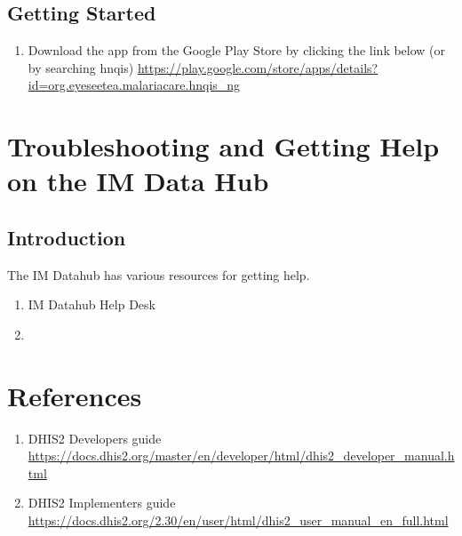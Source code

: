 \documentclass[]{book}
\providecommand{\tightlist}{%
  \setlength{\itemsep}{0pt}\setlength{\parskip}{0pt}}
\begin{document}
\hypertarget{getting-started-1}{%
\section{Getting Started}\label{getting-started-1}}

\begin{enumerate}
\def\labelenumi{\arabic{enumi}.}
\tightlist
\item
  Download the app from the Google Play Store by clicking the link below (or by searching hnqis)
  \url{https://play.google.com/store/apps/details?id=org.eyeseetea.malariacare.hnqis_ng}
\end{enumerate}

\hypertarget{trouble}{%
\chapter{Troubleshooting and Getting Help on the IM Data Hub}\label{trouble}}

\hypertarget{introduction-5}{%
\section{Introduction}\label{introduction-5}}

The IM Datahub has various resources for getting help.

\begin{enumerate}
\def\labelenumi{\arabic{enumi}.}
\item
  IM Datahub Help Desk
\item
\end{enumerate}

\hypertarget{references}{%
\chapter*{References}\label{references}}

\begin{enumerate}
\def\labelenumi{\arabic{enumi}.}
\item
  DHIS2 Developers guide
  \url{https://docs.dhis2.org/master/en/developer/html/dhis2_developer_manual.html}
\item
  DHIS2 Implementers guide
  \url{https://docs.dhis2.org/2.30/en/user/html/dhis2_user_manual_en_full.html}
\end{enumerate}


\end{document}
